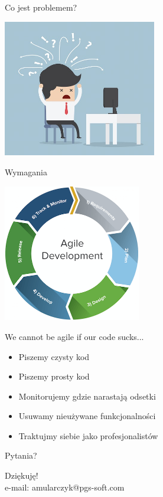 \documentclass{beamer}
\begin{document}
\begin{frame}{Co jest problemem?}
\begin{center}
  	\includegraphics[height=6cm]{problem.jpg}
\end{center}
\end{frame}

\begin{frame}{}
\begin{center}
\Huge{Wymagania}
\end{center}
\end{frame}

\begin{frame}{}
\begin{center}
  	\includegraphics[height=6cm]{agile.png}
\end{center}
\end{frame}

\begin{frame}{}
\begin{center}
{\color{red}\Large{We cannot be agile if our code sucks...}}
\end{center}
\end{frame}

\begin{frame}{}
     \begin{Large}
	\begin{itemize}
		\item Piszemy czysty kod
		\item Piszemy prosty kod
		\item Monitorujemy gdzie narastają odsetki
		\item Usuwamy nieużywane funkcjonalności
		\item Traktujmy siebie jako profesjonalistów
	\end{itemize}
     \end{Large}
\end{frame}


\begin{frame}{Pytania?}
\begin{center}
\Huge{Dziękuję!}\\
\Large{e-mail: amularczyk@pgs-soft.com}
\end{center}
\end{frame}
\end{document}
